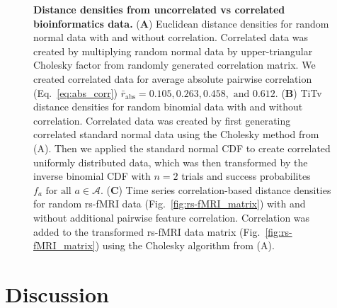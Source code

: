 \documentclass[10pt,letterpaper]{article}
\begin{document}

\begin{figure}[H]
	\centering
	\caption{{\bf Distance densities from uncorrelated vs correlated bioinformatics data.} (\textbf{A}) Euclidean distance densities for random normal data with and without correlation. Correlated data was created by multiplying random normal data by upper-triangular Cholesky factor from randomly generated correlation matrix. We created correlated data for average absolute pairwise correlation (Eq.~\ref{eq:abs_corr}) $\bar{r}_\text{abs} = 0.105, 0.263, 0.458, \text{ and } 0.612$. (\textbf{B}) TiTv distance densities for random binomial data with and without correlation. Correlated data was created by first generating correlated standard normal data using the Cholesky method from (A). Then we applied the standard normal CDF to create correlated uniformly distributed data, which was then transformed by the inverse binomial CDF with $n=2$ trials and success probabilites $f_a \text{ for all } a \in \mathcal{A}$. (\textbf{C}) Time series correlation-based distance densities for random rs-fMRI data (Fig.~\ref{fig:rs-fMRI_matrix}) with and without additional pairwise feature correlation. Correlation was added to the transformed rs-fMRI data matrix (Fig.~\ref{fig:rs-fMRI_matrix}) using the Cholesky algorithm from (A).}\label{fig:null_vs_correlated_ridge}
\end{figure}

\section*{Discussion}\label{sec:discussion}
\end{document}
